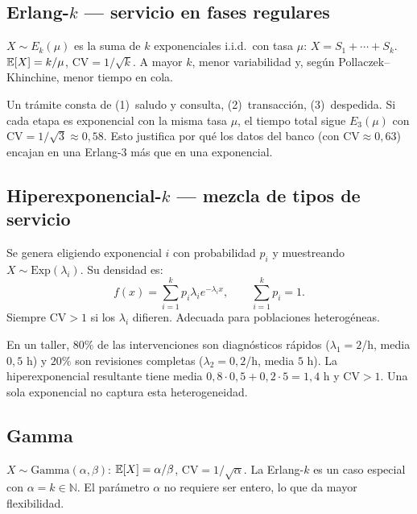 \documentclass[11pt, letterpaper]{article}
\begin{document}
\subsection{Erlang-$k$ --- servicio en fases regulares}

$X \sim E_k(\mu)$ es la suma de $k$ exponenciales i.i.d.\ con tasa $\mu$: $X = S_1 + \cdots + S_k$. $\mathbb{E}[X]=k/\mu$, $\text{CV} = 1/\sqrt{k}$. A mayor $k$, menor variabilidad y, según Pollaczek--Khinchine, menor tiempo en cola.

\begin{ejemplobox}
Un trámite consta de (1)~saludo y consulta, (2)~transacción, (3)~despedida. Si cada etapa es exponencial con la misma tasa $\mu$, el tiempo total sigue $E_3(\mu)$ con $\mathrm{CV}=1/\sqrt{3}\approx 0{,}58$. Esto justifica por qué los datos del banco (con $\mathrm{CV}\approx 0{,}63$) encajan en una Erlang-3 más que en una exponencial.
\end{ejemplobox}

\subsection{Hiperexponencial-$k$ --- mezcla de tipos de servicio}

Se genera eligiendo exponencial $i$ con probabilidad $p_i$ y muestreando $X \sim \text{Exp}(\lambda_i)$. Su densidad es:
\[
f(x) = \sum_{i=1}^{k} p_i \lambda_i e^{-\lambda_i x}, \qquad \sum_{i=1}^k p_i = 1.
\]
Siempre $\mathrm{CV}>1$ si los $\lambda_i$ difieren. Adecuada para poblaciones heterogéneas.

\begin{ejemplobox}
En un taller, $80\%$ de las intervenciones son diagnósticos rápidos ($\lambda_1=2$/h, media $0{,}5$ h) y $20\%$ son revisiones completas ($\lambda_2=0{,}2$/h, media $5$ h). La hiperexponencial resultante tiene media $0{,}8\cdot 0{,}5 + 0{,}2\cdot 5 = 1{,}4$ h y $\mathrm{CV}>1$. Una sola exponencial no captura esta heterogeneidad.
\end{ejemplobox}

\subsection{Gamma}

$X \sim \text{Gamma}(\alpha,\beta)$: $\mathbb{E}[X]=\alpha/\beta$, $\text{CV}=1/\sqrt{\alpha}$. La Erlang-$k$ es un caso especial con $\alpha=k \in \mathbb{N}$. El parámetro $\alpha$ no requiere ser entero, lo que da mayor flexibilidad.
\end{document}
